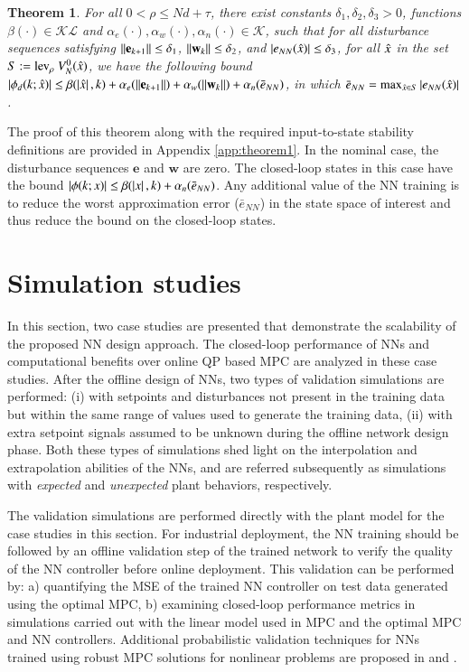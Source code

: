 \documentclass[preprint,5p, twocolumn, authoryear]{elsarticle}
\newtheorem{thm}{Theorem}
\begin{document}
\begin{thm} \label{thm:nnrobustness} For all $ 0 < \rho \leq Nd + \tau$, there
exist constants $\delta_1, \delta_2, \delta_3 > 0$, functions $\beta(\cdot) \in
\mathcal{K} \mathcal{L}$ and $\alpha_e(\cdot) , \alpha_w(\cdot),
\alpha_{n}(\cdot) \in \mathcal{K}$, such that for all disturbance sequences
satisfying $\left| \left| \mathbf{e}_{k+1} \right| \right| \leq \delta_1$,
$\left| \left| \mathbf{w}_k \right| \right| \leq \delta_2$, and $\left| e_{NN}(\hat{x}) \right| \leq
\delta_3$, for all $\hat{x}$ in the set $S := \textnormal{lev}_{\rho} \
V_N^0(\hat{x})$, we have the following bound $\left| \phi_d(k; \hat{x}) \right| \leq
\beta(\left| \hat{x} \right|, k) + \alpha_e(\left| \left| \mathbf{e}_{k+1} \right| \right|) +
\alpha_w(\left| \left| \mathbf{w}_k \right| \right|) + \alpha_n(\bar{e}_{NN})$, in which
$\bar{e}_{NN} = \textnormal{max}_{\hat{x} \in S} \left| e_{NN}(\hat{x}) \right|$.
\end{thm}

The proof of this theorem along with the required input-to-state stability
definitions are provided in Appendix \ref{app:theorem1}. In the nominal case,
the disturbance sequences $\mathbf{e}$ and $\mathbf{w}$ are zero. The
closed-loop states in this case have the bound $\left| \phi(k; x) \right| \leq
\beta(\left| x \right|, k) + \alpha_n(\bar{e}_{NN})$. Any additional value of the NN
training is to reduce the worst approximation error ($\bar{e}_{NN}$) in the
state space of interest and thus reduce the bound on the closed-loop states.

\section{Simulation studies} \label{sec:simulation_studies}

In this section, two case studies are presented that demonstrate the scalability
of the proposed NN design approach. The closed-loop performance of NNs and
computational benefits over online QP based MPC are analyzed in these case
studies. After the offline design of NNs, two types of validation simulations
are performed: (i) with setpoints and disturbances not present in the training
data but within the same range of values used to generate the training data,
(ii) with extra setpoint signals assumed to be unknown during the offline
network design phase. Both these types of simulations shed light on the
interpolation and extrapolation abilities of the NNs, and are referred
subsequently as simulations with \textit{expected} and \textit{unexpected} plant
behaviors, respectively. 

The validation simulations are performed directly with the plant model for the
case studies in this section. For industrial deployment, the NN training should
be followed by an offline validation step of the trained network to verify the
quality of the NN controller before online deployment. This validation can be
performed by: a) quantifying the MSE of the trained NN controller on test data
generated using the optimal MPC, b) examining closed-loop performance metrics in
simulations carried out with the linear model used in MPC and the optimal MPC
and NN controllers. Additional probabilistic validation techniques for NNs
trained using robust MPC solutions for nonlinear problems are proposed in
\cite{karg:alamo:lucia:2019} and \cite{hertneck:kohler:trimpe:allgower:2018}.
\end{document}
